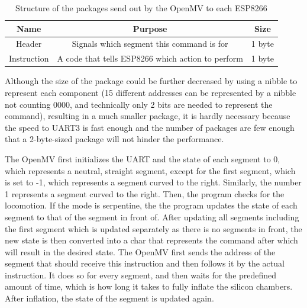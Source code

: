 \documentclass[twoside]{article}
\begin{document}
\begin{table}[H]
\centering
\begin{tabular}{|c|c|c|}
\hline
Name & Purpose & Size \\\hline
Header & Signals which segment this command is for & 1 byte\\\hline
Instruction & A code that tells ESP8266 which action to perform & 1 byte\\\hline
\end{tabular}
\caption{Structure of the packages send out by the OpenMV to each ESP8266}
\end{table}

Although the size of the package could be further decreased by using a nibble to represent each component (15 different addresses can be represented by a nibble not counting 0000, and technically only 2 bits are needed to represent the command), resulting in a much smaller package, it is hardly necessary because the speed to UART3 is fast enough and the number of packages are few enough that a 2-byte-sized package will not hinder the performance. 

The OpenMV first initializes the UART and the state of each segment to 0, which represents a neutral, straight segment, except for the first segment, which is set to -1, which represents a segment curved to the right. Similarly, the number 1 represents a segment curved to the right. Then, the program checks for the locomotion. If the mode is serpentine, the the program updates the state of each segment to that of the segment in front of. After updating all segments including the first segment which is updated separately as there is no segments in front, the new state is then converted into a char that represents the command after which will result in the desired state. The OpenMV first sends the address of the segment that should receive this instruction and then follows it by the actual instruction. It does so for every segment, and then waits for the predefined amount of time, which is how long it takes to fully inflate the silicon chambers. After inflation, the state of the segment is updated again.
\end{document}
